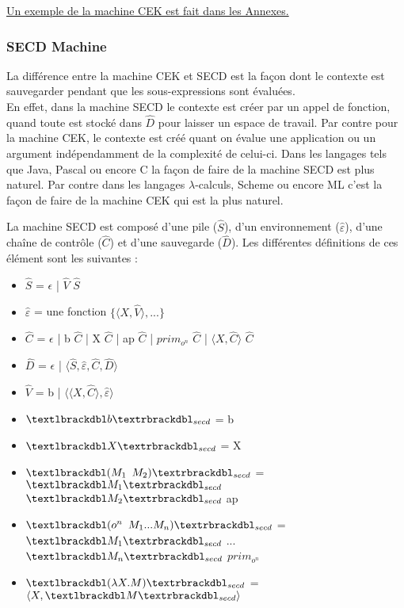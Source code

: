 \documentclass[10pt,a4paper]{article}
\begin{document}
			
			\hyperref[CEK]{Un exemple de la machine CEK est fait dans les Annexes.}
			
			\newpage
			
			\subsubsection{SECD Machine}
			La différence entre la machine CEK et SECD est la façon dont le contexte est sauvegarder pendant que les sous-expressions sont évaluées.\\
			En effet, dans la machine SECD le contexte est créer par un appel de fonction, quand toute est stocké dans $\widehat{D}$ pour laisser un espace de travail. Par contre pour la machine CEK, le contexte est créé quant on évalue une application ou un argument indépendamment de la complexité de celui-ci.
			\smallbreak 
			Dans les langages tels que Java, Pascal ou encore C la façon de faire de la machine SECD est plus naturel. Par contre  dans les langages $\lambda$-calculs, Scheme ou encore ML c'est la façon de faire de la machine CEK qui est la plus naturel.
			\medbreak
			
			La machine SECD est composé d'une pile ($\widehat{S}$), d'un environnement ($\widehat{\varepsilon}$), d'une chaîne de contrôle ($\widehat{C}$) et d'une sauvegarde ($\widehat{D}$). Les différentes définitions de ces élément sont les suivantes :
			\smallbreak
			\begin{itemize}
				\item[] $\widehat{S}$ = $\epsilon$ | $\widehat{V}$ $\widehat{S}$ 
				\item[] $\widehat{\varepsilon}$ = une fonction $\{\langle X,\widehat{V}\rangle,...\}$
				\item[] $\widehat{C}$ = $\epsilon$ | b $\widehat{C}$ | X $\widehat{C}$ | ap $\widehat{C}$ | $prim_{o^{n}}$ $\widehat{C}$ | $\langle X,\widehat{C}\rangle$ $\widehat{C}$
				\item[] $\widehat{D}$ = $\epsilon$ | $\langle\widehat{S},\widehat{\varepsilon},\widehat{C},\widehat{D}\rangle$
				\item[] $\widehat{V}$ = b | $\langle\langle X,\widehat{C}\rangle,\widehat{\varepsilon}\rangle$
				\item[] $\textlbrackdbl b\textrbrackdbl _{secd}$ = b
				\item[] $\textlbrackdbl X\textrbrackdbl _{secd}$ = X
				\item[] $\textlbrackdbl (M_{1}$ $M_{2})\textrbrackdbl _{secd}$ = $\textlbrackdbl M_{1}\textrbrackdbl _{secd}$ $\textlbrackdbl M_{2}\textrbrackdbl _{secd}$ ap
				\item[] $\textlbrackdbl (o^{n}$ $M_{1}...M_{n})\textrbrackdbl _{secd}$ = $\textlbrackdbl M_{1}\textrbrackdbl _{secd}$ $...$ $\textlbrackdbl M_{n}\textrbrackdbl _{secd}$ $prim_{o^{n}}$
				\item[]  $\textlbrackdbl(\lambda X.M)\textrbrackdbl _{secd}$ =  $\langle X,\textlbrackdbl M\textrbrackdbl _{secd}\rangle$
			\end{itemize}
			\bigbreak
			
\end{document}

